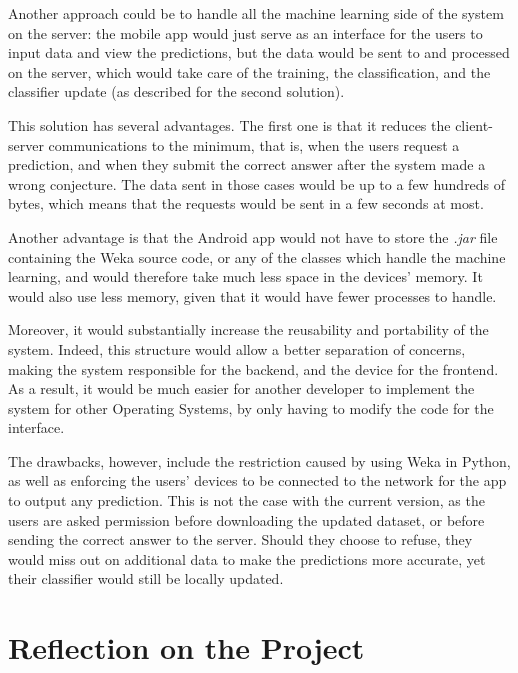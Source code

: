 \documentclass{mproj}
\begin{document}
Another approach could be to handle all the machine learning side of the system on the server: the mobile app would just serve as an interface for the users to input data and view the predictions, but the data would be sent to and processed on the server, which would take care of the training, the classification, and the classifier update (as described for the second solution). \par

This solution has several advantages. The first one is that it reduces the client-server communications to the minimum, that is, when the users request a prediction, and when they submit the correct answer after the system made a wrong conjecture. The data sent in those cases would be up to a few hundreds of bytes, which means that the requests would be sent in a few seconds at most. \par

Another advantage is that the Android app would not have to store the \textit{.jar} file containing the Weka source code, or any of the classes which handle the machine learning, and would therefore take much less space in the devices' memory. It would also use less memory, given that it would have fewer processes to handle. \par

Moreover, it would substantially increase the reusability and portability of the system. Indeed, this structure would allow a better separation of concerns, making the system responsible for the backend, and the device for the frontend. As a result, it would be much easier for another developer to implement the system for other Operating Systems, by only having to modify the code for the interface. \par

The drawbacks, however, include the restriction caused by using Weka in Python, as well as enforcing the users' devices to be connected to the network for the app to output any prediction. This is not the case with the current version, as the users are asked permission before downloading the updated dataset, or before sending the correct answer to the server. Should they choose to refuse, they would miss out on additional data to make the predictions more accurate, yet their classifier would still be locally updated.

\section{Reflection on the Project}
\end{document}
